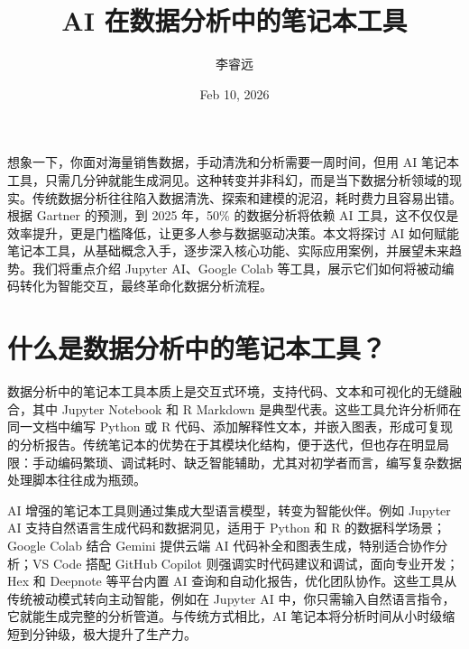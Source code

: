 \title{AI 在数据分析中的笔记本工具}
\author{李睿远}
\date{Feb 10, 2026}
\maketitle
想象一下，你面对海量销售数据，手动清洗和分析需要一周时间，但用 AI 笔记本工具，只需几分钟就能生成洞见。这种转变并非科幻，而是当下数据分析领域的现实。传统数据分析往往陷入数据清洗、探索和建模的泥沼，耗时费力且容易出错。根据 Gartner 的预测，到 2025 年，50\%{} 的数据分析将依赖 AI 工具，这不仅仅是效率提升，更是门槛降低，让更多人参与数据驱动决策。本文将探讨 AI 如何赋能笔记本工具，从基础概念入手，逐步深入核心功能、实际应用案例，并展望未来趋势。我们将重点介绍 Jupyter AI、Google Colab 等工具，展示它们如何将被动编码转化为智能交互，最终革命化数据分析流程。\par
\chapter{什么是数据分析中的笔记本工具？}
数据分析中的笔记本工具本质上是交互式环境，支持代码、文本和可视化的无缝融合，其中 Jupyter Notebook 和 R Markdown 是典型代表。这些工具允许分析师在同一文档中编写 Python 或 R 代码、添加解释性文本，并嵌入图表，形成可复现的分析报告。传统笔记本的优势在于其模块化结构，便于迭代，但也存在明显局限：手动编码繁琐、调试耗时、缺乏智能辅助，尤其对初学者而言，编写复杂数据处理脚本往往成为瓶颈。\par
AI 增强的笔记本工具则通过集成大型语言模型，转变为智能伙伴。例如 Jupyter AI 支持自然语言生成代码和数据洞见，适用于 Python 和 R 的数据科学场景；Google Colab 结合 Gemini 提供云端 AI 代码补全和图表生成，特别适合协作分析；VS Code 搭配 GitHub Copilot 则强调实时代码建议和调试，面向专业开发；Hex 和 Deepnote 等平台内置 AI 查询和自动化报告，优化团队协作。这些工具从传统被动模式转向主动智能，例如在 Jupyter AI 中，你只需输入自然语言指令，它就能生成完整的分析管道。与传统方式相比，AI 笔记本将分析时间从小时级缩短到分钟级，极大提升了生产力。\par
